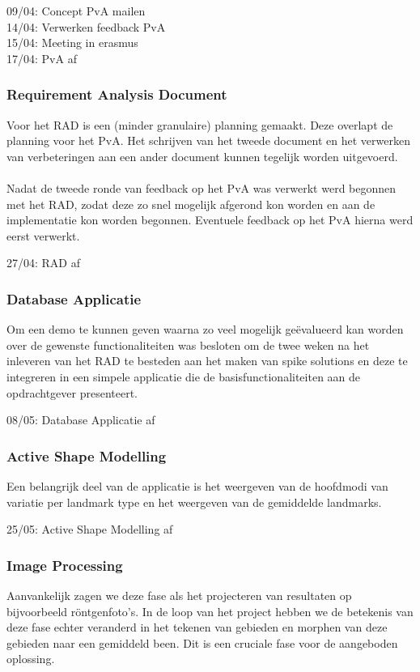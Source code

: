 09/04: Concept PvA mailen \\
14/04: Verwerken feedback PvA \\
15/04: Meeting in erasmus \\
17/04: PvA af

\subsubsection{Requirement Analysis Document}
Voor het RAD is een (minder granulaire) planning gemaakt. Deze overlapt
de planning voor het PvA. Het schrijven van het tweede document en
het verwerken van verbeteringen aan een ander document kunnen tegelijk worden
uitgevoerd.
\\
\\
Nadat de tweede ronde van feedback op het PvA was verwerkt werd begonnen met
het RAD, zodat deze zo snel mogelijk afgerond kon worden en aan de
implementatie kon worden begonnen. Eventuele feedback op het PvA hierna werd
eerst verwerkt.

27/04: RAD af

\subsubsection{Database Applicatie}
Om een demo te kunnen geven waarna zo veel mogelijk ge\"{e}valueerd kan worden
over de gewenste functionaliteiten was besloten om de twee weken na het
inleveren van het RAD te besteden aan het maken van spike solutions en deze te
integreren in een simpele applicatie die de basisfunctionaliteiten aan de
opdrachtgever presenteert.

08/05: Database Applicatie af

\subsubsection{Active Shape Modelling}
Een belangrijk deel van de applicatie is het weergeven van de hoofdmodi van
variatie per landmark type en het weergeven van de gemiddelde landmarks.

25/05: Active Shape Modelling af

\subsubsection{Image Processing}
Aanvankelijk zagen we deze fase als het projecteren van resultaten op
bijvoorbeeld r\"{o}ntgenfoto's. In de loop van het project hebben we de
betekenis van deze fase echter veranderd in het tekenen van gebieden en
morphen van deze gebieden naar een gemiddeld been. Dit is een cruciale fase
voor de aangeboden oplossing.

